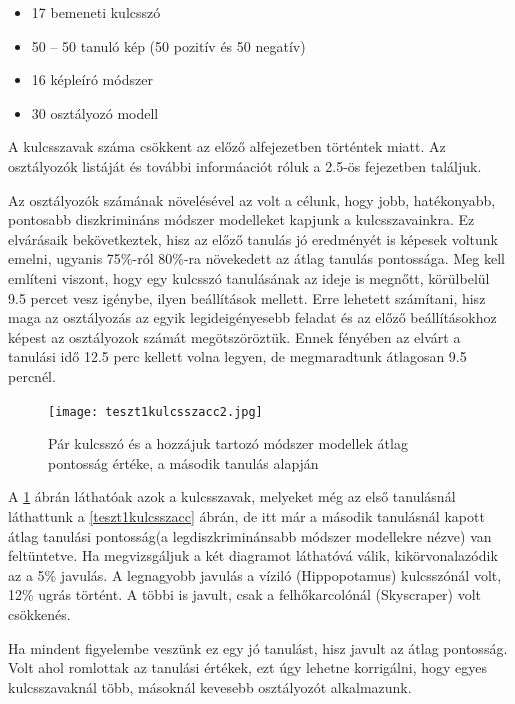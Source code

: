 \documentclass[12pt, a4paper, oneside]{book}
\theoremstyle{tetel}
\begin{document}
\begin{itemize}
  \item 17 bemeneti kulcsszó
  \item 50 – 50 tanuló kép (50 pozitív és 50 negatív)
  \item 16 képleíró módszer
  \item 30 osztályozó modell
\end{itemize}

	A kulcsszavak száma csökkent az előző alfejezetben történtek miatt. Az osztályozók listáját és további informáaciót róluk a 2.5-ös fejezetben találjuk.

	Az osztályozók számának növelésével az volt a célunk, hogy jobb, hatékonyabb, pontosabb diszkrimináns módszer modelleket kapjunk a kulcsszavainkra. Ez elvárásaik bekövetkeztek, hisz az előző tanulás jó eredményét is képesek voltunk emelni, ugyanis 75\%-ról 80\%-ra növekedett az átlag tanulás pontossága. Meg kell említeni viszont, hogy egy kulcsszó tanulásának az ideje is megnőtt, körülbelül 9.5 percet vesz igénybe, ilyen beállítások mellett. Erre lehetett számítani, hisz maga az osztályozás az egyik legideigényesebb feladat és az előző beállításokhoz képest az osztályozok számát megötszöröztük. Ennek fényében az elvárt a tanulási idő 12.5 perc kellett volna legyen, de megmaradtunk átlagosan 9.5 percnél.

\vspace{0.4cm}
\begin{figure}[h]
\begin{center}
\texttt{[image: teszt1kulcsszacc2.jpg]}
\caption{{Pár kulcsszó és a hozzájuk tartozó módszer modellek átlag pontosság értéke, a második tanulás alapján}}
\label{teszt1kulcsszacc2}
\end{center}
\end{figure}

	A \ref{teszt1kulcsszacc2} ábrán láthatóak azok a kulcsszavak, melyeket még az első tanulásnál láthattunk a \ref{teszt1kulcsszacc} ábrán, de itt már a második tanulásnál kapott átlag tanulási pontosság(a legdiszkriminánsabb  módszer modellekre nézve) van feltüntetve. Ha megvizsgáljuk a két diagramot láthatóvá válik, kikörvonalazódik az a 5\% javulás. A legnagyobb javulás a víziló (Hippopotamus) kulcsszónál volt, 12\% ugrás történt. A többi is javult, csak a felhőkarcolónál (Skyscraper) volt csökkenés.

	Ha mindent figyelembe veszünk ez egy jó tanulást, hisz javult az átlag pontosság. Volt ahol romlottak az tanulási értékek, ezt úgy lehetne korrigálni, hogy egyes kulcsszavaknál több, másoknál kevesebb osztályozót alkalmazunk.
\end{document}
